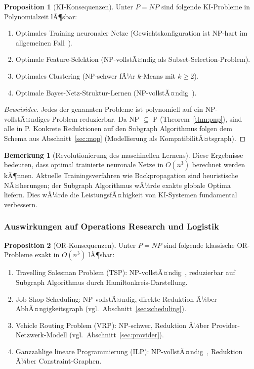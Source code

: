 ﻿\documentclass[a4paper,12pt]{article}
\theoremstyle{definition}
\newtheorem{bemerkung}{Bemerkung}[section]
\newtheorem{proposition}{Proposition}[section]
\begin{document}
\begin{proposition}[KI-Konsequenzen]
\label{prop:ki}
Unter $P = NP$ sind folgende KI-Probleme in Polynomialzeit lÃ¶sbar:
\begin{enumerate}
    \item Optimales Training neuronaler Netze (Gewichtskonfiguration ist NP-hart
          im allgemeinen Fall~\cite{blum1992}).
    \item Optimale Feature-Selektion (NP-vollstÃ¤ndig als Subset-Selection-Problem).
    \item Optimales Clustering (NP-schwer fÃ¼r $k$-Means mit $k \geq 2$).
    \item Optimale Bayes-Netz-Struktur-Lernen (NP-vollstÃ¤ndig~\cite{chickering1996}).
\end{enumerate}
\end{proposition}

\begin{proof}[Beweisidee]
Jedes der genannten Probleme ist polynomiell auf ein NP-vollstÃ¤ndiges Problem
reduzierbar. Da NP $\subseteq$ P (Theorem~\ref{thm:pnp}), sind alle in P.
Konkrete Reduktionen auf den Subgraph Algorithmus folgen dem Schema aus
Abschnitt~\ref{sec:mop} (Modellierung als KompatibilitÃ¤tsgraph).
\end{proof}

\begin{bemerkung}[Revolutionierung des maschinellen Lernens]
Diese Ergebnisse bedeuten, dass optimal trainierte neuronale Netze in $O(n^3)$
berechnet werden kÃ¶nnen. Aktuelle Trainingsverfahren wie Backpropagation sind
heuristische NÃ¤herungen; der Subgraph Algorithmus wÃ¼rde exakte globale Optima liefern.
Dies wÃ¼rde die LeistungsfÃ¤higkeit von KI-Systemen fundamental verbessern.
\end{bemerkung}

\subsubsection{Auswirkungen auf Operations Research und Logistik}

\begin{proposition}[OR-Konsequenzen]
\label{prop:or}
Unter $P = NP$ sind folgende klassische OR-Probleme exakt in $O(n^3)$ lÃ¶sbar:
\begin{enumerate}
    \item Travelling Salesman Problem (TSP): NP-vollstÃ¤ndig~\cite{garey1979},
          reduzierbar auf Subgraph Algorithmus durch Hamiltonkreis-Darstellung.
    \item Job-Shop-Scheduling: NP-vollstÃ¤ndig, direkte Reduktion Ã¼ber
          AbhÃ¤ngigkeitsgraph (vgl.\ Abschnitt~\ref{sec:scheduling}).
    \item Vehicle Routing Problem (VRP): NP-schwer, Reduktion Ã¼ber
          Provider-Netzwerk-Modell (vgl.\ Abschnitt~\ref{sec:provider}).
    \item Ganzzahlige lineare Programmierung (ILP): NP-vollstÃ¤ndig~\cite{karp1972},
          Reduktion Ã¼ber Constraint-Graphen.
\end{enumerate}
\end{proposition}
\end{document}
